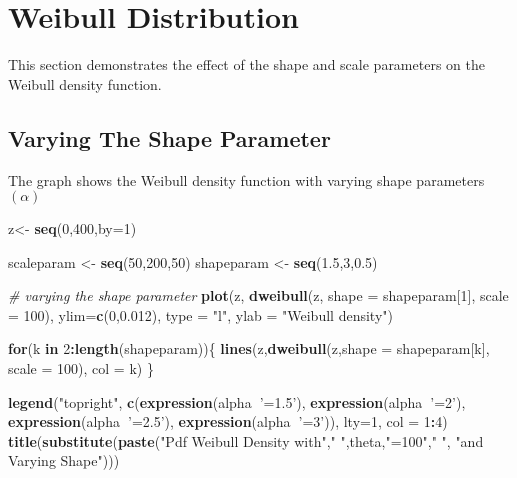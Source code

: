 \documentclass[]{book}
\newenvironment{Shaded}{\begin{snugshade}}{\end{snugshade}}
\newcommand{\KeywordTok}[1]{\textcolor[rgb]{0.13,0.29,0.53}{\textbf{#1}}}
\newcommand{\DataTypeTok}[1]{\textcolor[rgb]{0.13,0.29,0.53}{#1}}
\newcommand{\DecValTok}[1]{\textcolor[rgb]{0.00,0.00,0.81}{#1}}
\newcommand{\FloatTok}[1]{\textcolor[rgb]{0.00,0.00,0.81}{#1}}
\newcommand{\StringTok}[1]{\textcolor[rgb]{0.31,0.60,0.02}{#1}}
\newcommand{\CommentTok}[1]{\textcolor[rgb]{0.56,0.35,0.01}{\textit{#1}}}
\newcommand{\ControlFlowTok}[1]{\textcolor[rgb]{0.13,0.29,0.53}{\textbf{#1}}}
\newcommand{\OperatorTok}[1]{\textcolor[rgb]{0.81,0.36,0.00}{\textbf{#1}}}
\newcommand{\NormalTok}[1]{#1}
\theoremstyle{definition}
\theoremstyle{definition}
\theoremstyle{definition}
\theoremstyle{remark}
\begin{document}
\section{Weibull Distribution}\label{weibull-distribution}

This section demonstrates the effect of the shape and scale parameters
on the Weibull density function.

\subsection{Varying The Shape
Parameter}\label{varying-the-shape-parameter-2}

The graph shows the Weibull density function with varying shape
parameters \((\alpha)\)

\begin{Shaded}
\begin{Highlighting}[]
\NormalTok{z<-}\StringTok{ }\KeywordTok{seq}\NormalTok{(}\DecValTok{0}\NormalTok{,}\DecValTok{400}\NormalTok{,}\DataTypeTok{by=}\DecValTok{1}\NormalTok{)}

\NormalTok{scaleparam <-}\StringTok{ }\KeywordTok{seq}\NormalTok{(}\DecValTok{50}\NormalTok{,}\DecValTok{200}\NormalTok{,}\DecValTok{50}\NormalTok{)}
\NormalTok{shapeparam <-}\StringTok{ }\KeywordTok{seq}\NormalTok{(}\FloatTok{1.5}\NormalTok{,}\DecValTok{3}\NormalTok{,}\FloatTok{0.5}\NormalTok{)}

\CommentTok{# varying the shape parameter}
\KeywordTok{plot}\NormalTok{(z, }\KeywordTok{dweibull}\NormalTok{(z, }\DataTypeTok{shape =}\NormalTok{ shapeparam[}\DecValTok{1}\NormalTok{], }\DataTypeTok{scale =} \DecValTok{100}\NormalTok{), }\DataTypeTok{ylim=}\KeywordTok{c}\NormalTok{(}\DecValTok{0}\NormalTok{,}\FloatTok{0.012}\NormalTok{), }\DataTypeTok{type =} \StringTok{"l"}\NormalTok{, }\DataTypeTok{ylab =} \StringTok{"Weibull density"}\NormalTok{)}

\ControlFlowTok{for}\NormalTok{(k }\ControlFlowTok{in} \DecValTok{2}\OperatorTok{:}\KeywordTok{length}\NormalTok{(shapeparam))\{}
  \KeywordTok{lines}\NormalTok{(z,}\KeywordTok{dweibull}\NormalTok{(z,}\DataTypeTok{shape =}\NormalTok{ shapeparam[k], }\DataTypeTok{scale =} \DecValTok{100}\NormalTok{), }\DataTypeTok{col =}\NormalTok{ k)}
\NormalTok{\}}

\KeywordTok{legend}\NormalTok{(}\StringTok{"topright"}\NormalTok{,  }\KeywordTok{c}\NormalTok{(}\KeywordTok{expression}\NormalTok{(alpha}\OperatorTok{~}\StringTok{'=1.5'}\NormalTok{), }\KeywordTok{expression}\NormalTok{(alpha}\OperatorTok{~}\StringTok{'=2'}\NormalTok{), }\KeywordTok{expression}\NormalTok{(alpha}\OperatorTok{~}\StringTok{'=2.5'}\NormalTok{), }\KeywordTok{expression}\NormalTok{(alpha}\OperatorTok{~}\StringTok{'=3'}\NormalTok{)), }\DataTypeTok{lty=}\DecValTok{1}\NormalTok{, }\DataTypeTok{col =} \DecValTok{1}\OperatorTok{:}\DecValTok{4}\NormalTok{)}
\KeywordTok{title}\NormalTok{(}\KeywordTok{substitute}\NormalTok{(}\KeywordTok{paste}\NormalTok{(}\StringTok{"Pdf Weibull Density with"}\NormalTok{,}\StringTok{" "}\NormalTok{,theta,}\StringTok{"=100"}\NormalTok{,}\StringTok{" "}\NormalTok{, }\StringTok{"and Varying Shape"}\NormalTok{)))}
\end{Highlighting}
\end{Shaded}
\end{document}

